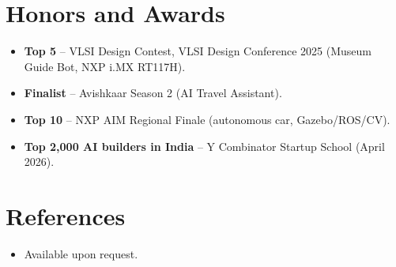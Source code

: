 \documentclass[11pt,a4paper,sans]{moderncv}
\begin{document}
\section{Honors and Awards}
\vspace{1pt}
\begin{itemize}
\item \textbf{Top 5} -- VLSI Design Contest, VLSI Design Conference 2025 (Museum Guide Bot, NXP i.MX RT117H).
\item \textbf{Finalist} -- Avishkaar Season 2 (AI Travel Assistant).
\item \textbf{Top 10} -- NXP AIM Regional Finale (autonomous car, Gazebo/ROS/CV).
\item \textbf{Top 2,000 AI builders in India} -- Y Combinator Startup School (April 2026).
\end{itemize}

\section{References}
\vspace{1pt}
\begin{itemize}
\item{Available upon request.}
\end{itemize}
\end{document}
